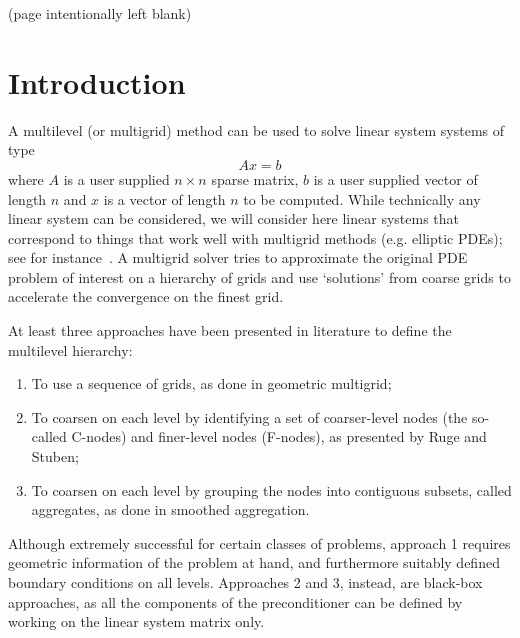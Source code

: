 \documentclass{article}[11pt]
\begin{document}
%
\clearpage
\newpage

\vfill
\begin{center}
(page intentionally left blank)
\end{center}
\clearpage
\newpage


\tableofcontents
\newpage

\section{Introduction} 
\label{sec:introduction}

A multilevel (or multigrid) method can be used to solve linear
system systems of type
\begin{equation}
\label{eq:lin_sys}
A x = b
\end{equation}
where $A$ is a user supplied $n \times n$ sparse matrix, $b$ is a
user supplied vector of length $n$ and $x$ is a vector of length $n$ to
be computed. 
While technically any linear system can be considered, we will consider 
here linear systems that correspond to things that work
well with multigrid methods (e.g. elliptic PDEs); see for 
instance~\cite{brandt.classic,hack.book,hack2.book}.
A multigrid solver tries to approximate
the original PDE problem of interest on a hierarchy of grids and use
`solutions' from coarse grids to accelerate the convergence
on the finest grid. 

\medskip

At least three
approaches have been presented in literature to define the multilevel
hierarchy:
\begin{enumerate}
\item To use a sequence of grids, as done in geometric multigrid;
\item To coarsen on each level by identifying a set of coarser-level nodes
(the so-called C-nodes) and finer-level nodes (F-nodes), as presented
by Ruge and Stuben;
\item To coarsen on each level by grouping the nodes into contiguous subsets,
called aggregates, as done in smoothed aggregation.
\end{enumerate}

Although extremely successful for certain classes of problems, approach 1
requires geometric information of the problem at hand, and furthermore
suitably defined boundary conditions on all levels. Approaches 2 and 3,
  instead, are black-box approaches, as all the components of the
  preconditioner can be defined by working on the linear system matrix only.
\end{document}
